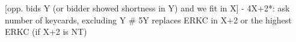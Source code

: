 [opp. bids Y (or bidder showed shortness in Y) and we fit in X] - 
4X+2*: ask number of keycards, excluding Y
# 5Y replaces ERKC in X+2 or the highest ERKC (if X+2 is NT)